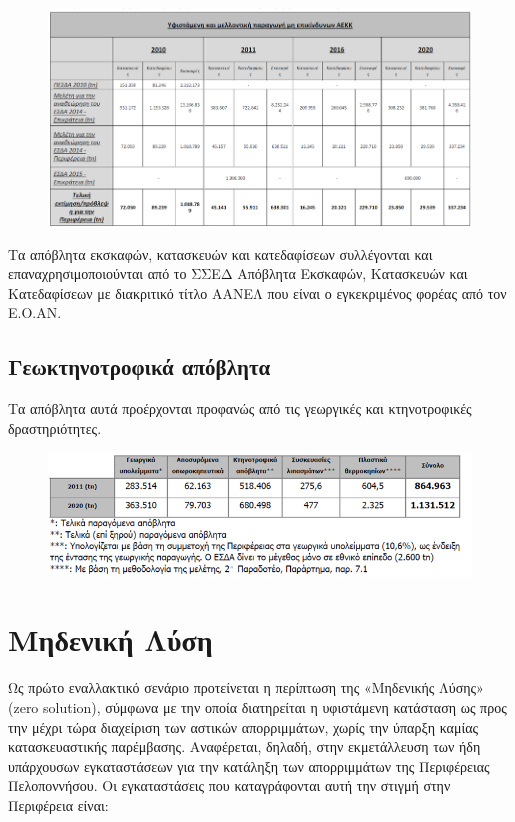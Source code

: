 \documentclass[12pt]{article}
\begin{document}
	\begin{figure} [H]
		\begin{center}
			\includegraphics [scale = 0.45] {table9.png}
		\end{center}
	\end{figure}

	Τα απόβλητα εκσκαφών, κατασκευών και κατεδαφίσεων συλλέγονται και επαναχρησιμοποιούνται από το ΣΣΕΔ Απόβλητα Εκσκαφών, Κατασκευών και Κατεδαφίσεων με διακριτικό τίτλο ΑΑΝΕΛ που είναι ο εγκεκριμένος φορέας από τον Ε.Ο.ΑΝ.
	
	\subsection{Γεωκτηνοτροφικά απόβλητα}
	
	Τα απόβλητα αυτά προέρχονται προφανώς από τις γεωργικές και κτηνοτροφικές δραστηριότητες.
	
	\begin{figure} [H]
		\begin{center}
			\includegraphics [scale = 0.50] {table10.png}
		\end{center}
	\end{figure}

	\section{Μηδενική Λύση}
	
	Ως πρώτο εναλλακτικό σενάριο προτείνεται η περίπτωση της «Μηδενικής Λύσης» (zero solution), σύμφωνα με την οποία διατηρείται η υφιστάμενη κατάσταση ως προς την μέχρι τώρα διαχείριση των αστικών απορριμμάτων, χωρίς την ύπαρξη καμίας κατασκευαστικής παρέμβασης. Αναφέρεται, δηλαδή, στην εκμετάλλευση των ήδη υπάρχουσων εγκαταστάσεων για την κατάληξη των απορριμμάτων της Περιφέρειας Πελοποννήσου. Οι εγκαταστάσεις που καταγράφονται αυτή την στιγμή στην Περιφέρεια είναι:
	
\end{document}
